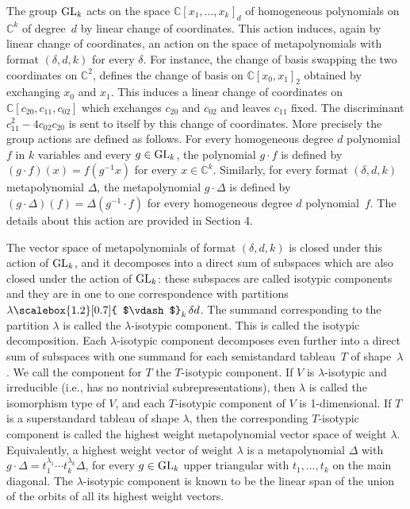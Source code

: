 The group $\textnormal{GL}_{k}$ acts on the space $\mathbb{C}[x_{1},\ldots,x_{k}]_{d}$ of homogeneous polynomials on $\mathbb{C}^{k}$ of degree $d$ by linear change of coordinates. This action induces, again by linear change of coordinates, an action on the space of metapolynomials with format $(\delta,d,k)$ for every $\delta$.
For instance, the change of basis swapping the two coordinates on $\mathbb{C}^{2}$, defines the change of basis on $\mathbb{C}[x_{0},x_{1}]_{2}$ obtained by exchanging $x_{0}$ and $x_{1}$. This induces a linear change of coordinates on $\mathbb{C}[c_{20},c_{11},c_{02}]$ which exchanges $c_{20}$ and $c_{02}$ and leaves $c_{11}$ fixed. The discriminant $c_{11}^{2}-4c_{02}c_{20}$ is sent to itself by this change of coordinates.
More precisely the group actions are defined as follows. For every homogeneous degree $d$ polynomial $f$ in $k$ variables and every $g\in\textnormal{GL}_{k}$, the polynomial $g\cdot f$ is defined by $(g\cdot f)(x)=f(g^{-1}x)$ for every $x\in\mathbb{C}^{k}$. Similarly, for every format $(\delta,d,k)$ metapolynomial $\Delta$, the metapolynomial $g\cdot\Delta$ is defined by $(g\cdot\Delta)(f)=\Delta(g^{-1}\cdot f)$ for every homogeneous degree $d$ polynomial $f$. The details about this action are provided in Section 4.





The vector space of metapolynomials of format $(\delta,d,k)$ is closed under this action of $\textnormal{GL}_{k}$, and it decomposes into a direct sum of subspaces which are also closed under the action of $\textnormal{GL}_{k}$: these subspaces are called isotypic components and they are in one to one correspondence with partitions $\lambda\mathchoice{\scalebox{1.2}[0.7]{ $\vdash$}_{k}\,}{\scalebox{1.2}[0.7]{ $\vdash$}_{k}\,}{\scalebox{0.7}{\scalebox{1.2}[0.7]{$\vdash$}}_{k}\,}{\scalebox{0.5}{\scalebox{1.2}[0.7]{$\vdash$}}_{k}\,}{\delta d}$.
The summand corresponding to the partition $\lambda$ is called the $\lambda$-isotypic component. This is called the isotypic decomposition. Each $\lambda$-isotypic component decomposes even further into a direct sum of subspaces with one summand for each semistandard tableau $T$ of shape $\lambda$.
We call the component for $T$ the $T$-isotypic component.
If $V$ is $\lambda$-isotypic and irreducible (i.e., has no nontrivial subrepresentations), then $\lambda$ is called the isomorphism type of $V$, and each $T$-isotypic component of $V$ is 1-dimensional.
If $T$ is a superstandard tableau of shape $\lambda$, then the corresponding $T$-isotypic component is called the highest weight metapolynomial vector space of weight $\lambda$.
Equivalently, a highest weight vector of weight $\lambda$ is a metapolynomial $\Delta$ with $g\cdot\Delta=t_{1}^{\lambda_{1}}\cdots t_{k}^{\lambda_{k}}\Delta$, for every $g\in\textnormal{GL}_{k}$ upper triangular with $t_{1},\ldots,t_{k}$ on the main diagonal. The $\lambda$-isotypic component is known to be the linear span of the union of the orbits of all its highest weight vectors.





